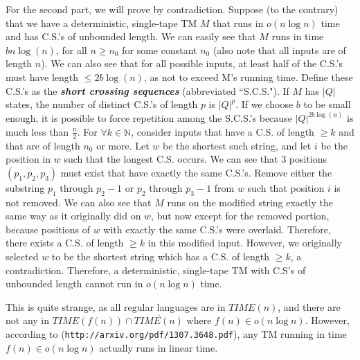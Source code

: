 \begin{enumerate}
\par For the second part, we will prove by contradiction. Suppose (to the contrary) that we have a deterministic, single-tape TM $M$ that runs in $o(n \log n)$ time and has C.S.'s of unbounded length. We can easily see that $M$ runs in time $bn\log(n)$, for all $n \ge n_0$ for some constant $n_0$ (also note that all inputs are of length $n$). We can also see that for all possible inputs, at least half of the C.S.'s must have length $\le 2b\log(n)$, as not to exceed M's running time. Define these C.S.'s as the \textbf{\emph{short crossing sequences}} (abbreviated ``S.C.S."). If $M$ has $|Q|$ states, the number of distinct C.S.'s of length $p$ is $|Q|^p$. If we choose $b$ to be small enough, it is possible to force repetition among the S.C.S.'s because $|Q|^{2b\log(n)}$ is much less than $\frac{n}{2}$. For $\forall k \in \mathbb{N}$, consider inputs that have a C.S. of length $\ge k$ and that are of length $n_0$ or more. Let $w$ be the shortest such string, and let $i$ be the position in $w$ such that the longest C.S. occurs. We can see that 3 positions $(p_1, p_2, p_3)$ must exist that have exactly the same C.S.'s. Remove either the substring $p_1$ through $p_2-1$ or $p_2$ through $p_3-1$ from $w$ such that position $i$ is not removed. We can also see that $M$ runs on the modified string exactly the same way as it originally did on $w$, but now except for the removed portion, because positions of $w$ with exactly the same C.S.'s were overlaid. Therefore, there exists a C.S. of length $\ge k$ in this modified input. However, we originally selected $w$ to be the shortest string which has a C.S. of length $\ge k$, a contradiction. Therefore, a deterministic, single-tape TM with C.S's of unbounded length cannot run in $o(n \log n)$ time.

\par This is quite strange, as all regular languages are in $TIME(n)$, and there are not any in $TIME(f(n)) \cap \overline{TIME(n)}$ where $f(n) \in o(n \log n)$. However, according to (\texttt{http://arxiv.org/pdf/1307.3648.pdf}), any TM running in time $f(n) \in o(n \log n)$ actually runs in linear time.

\end{enumerate}